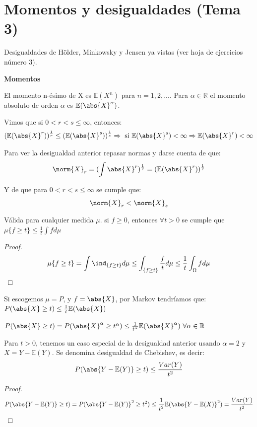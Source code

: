 \documentclass{apuntes}
\begin{document}
\chapter{Momentos y desigualdades (Tema 3)}
Desigualdades de Hölder, Minkowsky y Jensen ya vistas (ver hoja de ejercicios número 3).

\textbf{Momentos}

\begin{defn}
El momento n-ésimo de X es $\mathbb{E}(X^n)$ para $n=1,2,...$.  Para $\alpha \in \mathbb{R}$ el momento absoluto de orden $\alpha$ es $\mathbb{E}(\abs{X}^{\alpha})$.

Vimos que si $0 < r < s \leq \infty$, entonces:
\[
(\mathbb{E}(\abs{X}^r))^{\frac{1}{r}} \leq (\mathbb{E}(\abs{X}^s))^{\frac{1}{s}} \Rightarrow \text{ si } \mathbb{E}(\abs{X}^s) < \infty \Rightarrow \mathbb{E}(\abs{X}^r) < \infty
\]

\begin{expla}
Para ver la desigualdad anterior repasar normas y darse cuenta de que:
\[
\norm{X}_r = (\int \abs{X}^r)^{\frac{1}{r}} = (\mathbb{E}(\abs{X}^r))^{\frac{1}{r}}
\]

Y de que para $0 < r < s \leq \infty$ se cumple que:
\[
\norm{X}_r < \norm{X}_s
\]
\end{expla}
\end{defn}

\begin{defn}
Válida para cualquier medida $\mu$. si $f \geq 0$, entonces $\forall t > 0$ se cumple que $\mu\{f \geq t\} \leq \frac{1}{t}\int f d\mu$

\begin{proof}
\[
\mu\{f \geq t\} = \int \ind_{\{f \geq t\}} d\mu \leq \int_{\{f \geq t\}} \frac{f}{t} d\mu \leq \frac{1}{t}\int_{\Omega}f d\mu
\]
\end{proof}

Si escogemos $\mu=P$, y $f=\abs{X}$, por Markov tendríamos que: $P(\abs{X}\geq t) \leq \frac{1}{t} \mathbb{E}(\abs{X})$
\end{defn}

\obs $P(\abs{X}\geq t) = P(\abs{X}^{\alpha}\geq t^{\alpha}) \leq \frac{1}{t^{\alpha}} \mathbb{E}(\abs{X}^{\alpha}) \text{ } \forall \alpha \in \mathbb{R}$

\obs Para $t>0$, tenemos un caso especial de la desigualdad anterior usando $\alpha=2$ y $X=Y-\mathbb{E}(Y)$. Se denomina desigualdad de Chebishev, es decir:
\[
P(\abs{Y-\mathbb{E}(Y)}\geq t) \leq \frac{Var(Y)}{t^2}
\]
\begin{proof}
\[
P(\abs{Y-\mathbb{E}(Y)}\geq t) = P(\abs{Y-\mathbb{E}(Y)}^2\geq t^2) \leq \frac{1}{t^2}\mathbb{E}(\abs{Y-\mathbb{E}(X)}^2) = \frac{Var(Y)}{t^2}
\]
\end{proof}
\end{document}
